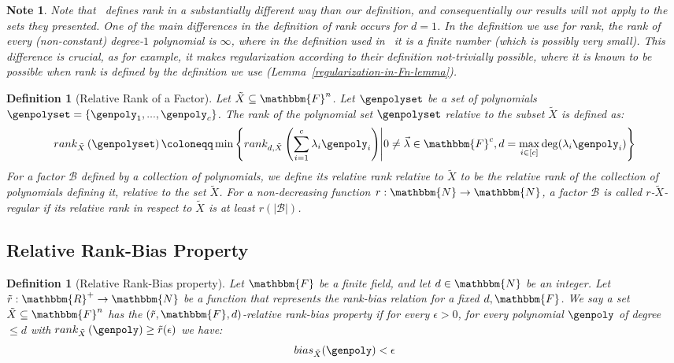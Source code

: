\documentclass[10pt,a4paper]{article}
\newtheorem{definition}[theorem]{Definition}
\newtheorem{note}[theorem]{Note}
\newcommand{\definedas}[0]{\coloneqq}
\newcommand{\parens}[1]{\left( #1 \right)}
\newcommand{\sparens}[1]{\left[ #1 \right]}
\newcommand{\set}[1]{\left\{ #1 \right\}}
\newcommand{\suchthat}[0]{\middle|}
\newcommand{\basefield}[0]{\mathbbm{F}}
\newcommand{\blocklength}[0]{n}
\newcommand{\field}[0]{\basefield^{\blocklength}}
\newcommand{\degree}[0]{d}
\newcommand{\funcdef}[3]{#1:#2\rightarrow#3}
\newcommand{\factor}[0]{\mathcal{B}}
\newcommand{\naturalnumbersset}[0]{\mathbbm{N}}
\newcommand{\realnumbersset}[0]{\mathbbm{R}}
\newcommand{\variety}{{\tilde{X}}}
\newcommand{\relrank}[2]{rank_{#1} \parens{#2}}
\newcommand{\drelrank}[3]{rank_{{#1}, {#2}} \parens{#3}}
\newcommand{\rankfunc}[0]{{{{r}}}}
\newcommand{\rankbiasfunc}[0]{{\tilde{r}}}
\newcommand{\relbias}[2]{bias_{#1}{({#2})}}
\newcommand{\abs}[1]{\left| #1 \right|}
\begin{document}
\begin{note}\label{note:comparison-to-gowers-rank}
    Note that~\cite[Definition 1.3]{gowers2022equidistributionhighrankpolynomialsvariables} defines rank in a substantially different way than our definition,
    and consequentially our results will not apply to the sets they presented.
    One of the main differences in the definition of rank occurs for $\degree = 1$.
    In the definition we use for rank, the rank of every (non-constant) degree-$1$ polynomial is $\infty$, where in the definition used in~\cite{gowers2022equidistributionhighrankpolynomialsvariables} it is a finite number (which is possibly very small).
    This difference is crucial, as for example, it makes regularization according to their definition not-trivially possible,
    where it is known to be possible when rank is defined by the definition we use (Lemma~\ref{regularization-in-Fn-lemma}).
\end{note}
\begin{definition}[Relative Rank of a Factor]
    Let $\variety \subseteq \field$.
    Let $\genpolyset$ be a set of polynomials $\genpolyset = \set{\genpoly_1,...,\genpoly_c}$.
    The rank of the polynomial set $\genpolyset$ relative to the subset $\variety$ is defined as:
    \[
        \relrank{\variety}{\genpolyset} \definedas \min \set{\drelrank{\degree}{\variety}{\sum_{i=1}^c{\lambda_i \genpoly_i}} \suchthat 0 \neq \vec{\lambda} \in \basefield^c, \degree = \max_{i \in \sparens{c}}{\deg(\lambda_i \genpoly_i)}}
    \]
    For a factor $\factor$ defined by a collection of polynomials, we define its relative rank relative to $\variety$ to be the relative rank of the collection of polynomials defining it, relative to the set $\variety$.
    \newline
    For a non-decreasing function $\funcdef{\rankfunc}{\naturalnumbersset}{\naturalnumbersset}$, a factor $\factor$ is called $\rankfunc$-$\variety$-regular if its relative rank in respect to $\variety$ is at least $\rankfunc(\abs{\factor})$.
\end{definition}

\subsection[Relative Rank-Bias Property]{Relative Rank-Bias Property}
\begin{definition}[Relative Rank-Bias property]
    Let $\basefield$ be a finite field, and let $\degree \in \naturalnumbersset$ be an integer.
    Let $\funcdef{\rankbiasfunc}{\realnumbersset^{+}}{\naturalnumbersset}$ be a function that represents the rank-bias relation for a fixed $\degree, \basefield$.
    \newline
    We say a set $\variety \subseteq \field$ has the \emph{$(\rankbiasfunc, \basefield, \degree)$-relative rank-bias property} if
    for every $\epsilon > 0$,
    for every polynomial $\genpoly$ of degree $\leq \degree$ with $\relrank{\variety}{\genpoly} \geq \rankbiasfunc(\epsilon)$ we have:
    \[
        \relbias{\variety}{\genpoly} < \epsilon
    \]
\end{definition}
\end{document}
